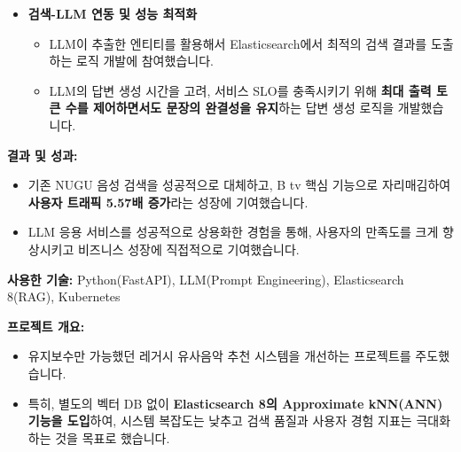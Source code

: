 \documentclass[letterpaper,11pt]{article}
\begin{document}
{{\begin{itemize}[leftmargin=*]
              \item \textbf{검색-LLM 연동 및 성능 최적화}
                  \begin{itemize}[leftmargin=*, label=$\circ$]
                      \item LLM이 추출한 엔티티를 활용해서 Elasticsearch에서 최적의 검색 결과를 도출하는 로직 개발에 참여했습니다.
                      \item LLM의 답변 생성 시간을 고려, 서비스 SLO를 충족시키기 위해 \textbf{최대 출력 토큰 수를 제어하면서도 문장의 완결성을 유지}하는 답변 생성 로직을 개발했습니다.
                  \end{itemize}
          \end{itemize}

          \textbf{결과 및 성과:}
          \begin{itemize}[leftmargin=*]
              \item 기존 NUGU 음성 검색을 성공적으로 대체하고, B tv 핵심 기능으로 자리매김하여 \textbf{사용자 트래픽 5.57배 증가}라는 성장에 기여했습니다.
              \item LLM 응용 서비스를 성공적으로 상용화한 경험을 통해, 사용자의 만족도를 크게 향상시키고 비즈니스 성장에 직접적으로 기여했습니다.
          \end{itemize}

          \textbf{사용한 기술:} Python(FastAPI), LLM(Prompt Engineering), Elasticsearch 8(RAG), Kubernetes
        }
      \resumeSubProjectListEnd
    
      \resumeSubProjectListStart

        {
          \textbf{프로젝트 개요:}
          \begin{itemize}[leftmargin=*]
              \item 유지보수만 가능했던 레거시 유사음악 추천 시스템을 개선하는 프로젝트를 주도했습니다.
              \item 특히, 별도의 벡터 DB 없이 \textbf{Elasticsearch 8의 Approximate kNN(ANN) 기능을 도입}하여, 시스템 복잡도는 낮추고 검색 품질과 사용자 경험 지표는 극대화하는 것을 목표로 했습니다.
          \end{itemize}

}}
\end{document}
